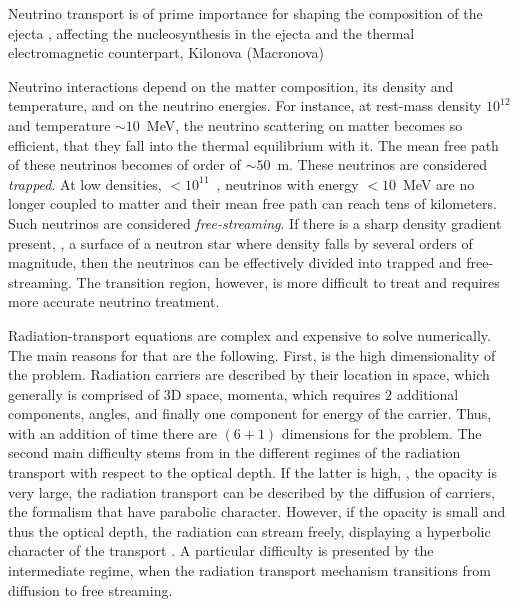 Neutrino transport is of prime importance for shaping the composition of the ejecta
\citep{Wanajo:2014wha,Sekiguchi:2015dma,Foucart:2015vpa,Foucart:2015gaa},
affecting the nucleosynthesis in the ejecta \citep{pWanajo:2014wha,Goriely:2015fqa} 
and the thermal electromagnetic counterpart, Kilonova (Macronova) \citep{Metzger:2014ila,Lippuner:2015gwa}

Neutrino interactions depend on the matter composition, its density and temperature, and on the neutrino energies. 
For instance, at rest-mass density $10^{12}$\gcm and temperature $\sim10$~MeV, 
the neutrino scattering on matter becomes so efficient, that they fall into the thermal equilibrium with it. 
The mean free path of these neutrinos becomes of order of $\sim 50$~m. 
These neutrinos are considered \textit{trapped}.
%
At low densities, $<10^{11}$~\gcm, neutrinos with energy $<10$~MeV are no longer coupled to matter 
and their mean free path can reach tens of kilometers. 
Such neutrinos are considered \textit{free-streaming}.
%
If there is a sharp density gradient present, \eg, a surface of a neutron star where density falls 
by several orders of magnitude, then the neutrinos can be effectively divided into trapped and free-streaming. 
%
The transition region, however, is more difficult to treat and requires more accurate neutrino treatment.



Radiation-transport equations are complex and expensive to solve numerically. 
The main reasons for that are the following. First, is the high dimensionality of the problem. 
Radiation carriers are described by their location in space, which generally is comprised of $3$D space, momenta, 
which requires $2$ additional components, angles, and finally one component for energy of the carrier. 
Thus, with an addition of time there are $(6+1)$ dimensions for the problem. 
The second main difficulty stems from in the different regimes of the radiation transport with respect 
to the optical depth. If the latter is high, \ie, the opacity is very large, the radiation transport 
can be described by the diffusion of carriers, the formalism that have parabolic character. 
However, if the opacity is small and thus the optical depth, the radiation can stream freely, 
displaying a hyperbolic character of the transport \citep{Mihalas:1984}. 
A particular difficulty is presented by the intermediate regime, when the radiation transport 
mechanism transitions from diffusion to free streaming. 

